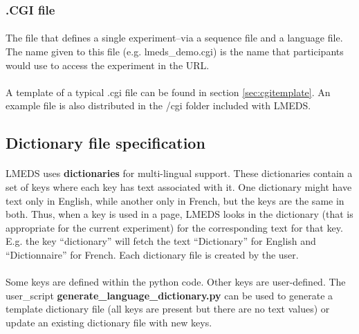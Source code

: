 \documentclass[12pt, oneside]{scrbook}   	%
\begin{document}
\subsubsection{.CGI file}

\paragraph{}
The file that defines a single experiment--via a sequence file and a language file.  The name given to this file (e.g. lmeds\_demo.cgi) is the name that participants would use to access the experiment in the URL.

\paragraph{}
A template of a typical .cgi file can be found in section \ref{sec:cgitemplate}.  An example file is also distributed in the /cgi folder included with LMEDS.

\subsection{Dictionary file specification}
\label{sec:dictionarySpec}

\paragraph{}
LMEDS uses \textbf{dictionaries} for multi-lingual support.  These dictionaries contain a set of keys where each key has text associated with it.  One dictionary might have text only in English, while another only in French, but the keys are the same in both.  Thus, when a key is used in a page, LMEDS looks in the dictionary (that is appropriate for the current experiment) for the corresponding text for that key.  E.g. the key ``dictionary'' will fetch the text ``Dictionary'' for English and  ``Dictionnaire'' for French.  Each dictionary file is created by the user.

\paragraph{}
Some keys are defined within the python code.  Other keys are user-defined.  The user\_script \textbf{generate\_language\_dictionary.py} can be used to generate a template dictionary file (all keys are present but there are no text values) or update an existing dictionary file with new keys.
\end{document}
